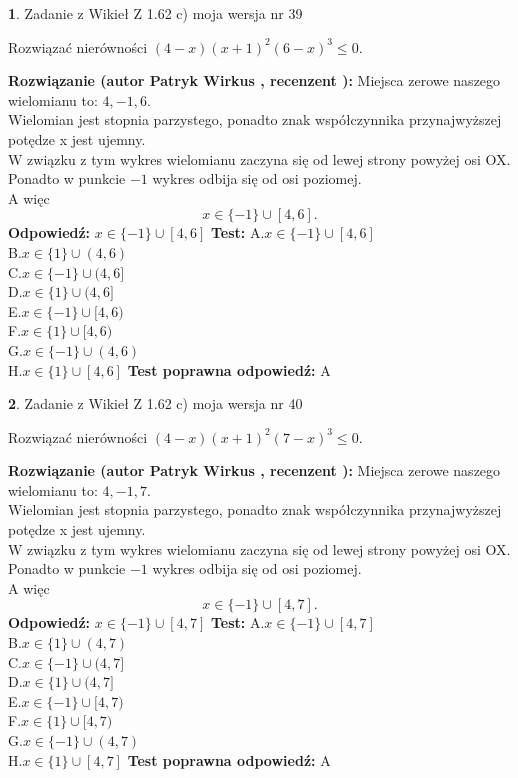 \documentclass[12pt, a4paper]{article}
\theoremstyle{definition} %
\newtheorem{zad}{}
\newcommand{\zadStart}[1]{\begin{zad}#1\newline}
\newcommand{\zadStop}{\end{zad}}
\newcommand{\rozwStart}[2]{\noindent \textbf{Rozwiązanie (autor #1 , recenzent #2): }\newline}
\newcommand{\rozwStop}{\newline}
\newcommand{\odpStart}{\noindent \textbf{Odpowiedź:}\newline}
\newcommand{\odpStop}{\newline}
\newcommand{\testStart}{\noindent \textbf{Test:}\newline}
\newcommand{\testStop}{\newline}
\newcommand{\kluczStart}{\noindent \textbf{Test poprawna odpowiedź:}\newline}
\newcommand{\kluczStop}{\newline}
\begin{document}
\zadStart{Zadanie z Wikieł Z 1.62 c) moja wersja nr 39}

Rozwiązać nierówności $(4-x)(x+1)^{2}(6-x)^{3}\le0$.
\zadStop
\rozwStart{Patryk Wirkus}{}
Miejsca zerowe naszego wielomianu to: $4, -1, 6$.\\
Wielomian jest stopnia parzystego, ponadto znak współczynnika przy\linebreak najwyższej potędze x jest ujemny.\\ W związku z tym wykres wielomianu zaczyna się od lewej strony powyżej osi OX.\\
Ponadto w punkcie $-1$ wykres odbija się od osi poziomej.\\
A więc $$x \in \{-1\} \cup [4,6].$$
\rozwStop
\odpStart
$x \in \{-1\} \cup [4,6]$
\odpStop
\testStart
A.$x \in \{-1\} \cup [4,6]$\\
B.$x \in \{1\} \cup (4,6)$\\
C.$x \in \{-1\} \cup (4,6]$\\
D.$x \in \{1\} \cup (4,6]$\\
E.$x \in \{-1\} \cup [4,6)$\\
F.$x \in \{1\} \cup [4,6)$\\
G.$x \in \{-1\} \cup (4,6)$\\
H.$x \in \{1\} \cup [4,6]$
\testStop
\kluczStart
A
\kluczStop



\zadStart{Zadanie z Wikieł Z 1.62 c) moja wersja nr 40}

Rozwiązać nierówności $(4-x)(x+1)^{2}(7-x)^{3}\le0$.
\zadStop
\rozwStart{Patryk Wirkus}{}
Miejsca zerowe naszego wielomianu to: $4, -1, 7$.\\
Wielomian jest stopnia parzystego, ponadto znak współczynnika przy\linebreak najwyższej potędze x jest ujemny.\\ W związku z tym wykres wielomianu zaczyna się od lewej strony powyżej osi OX.\\
Ponadto w punkcie $-1$ wykres odbija się od osi poziomej.\\
A więc $$x \in \{-1\} \cup [4,7].$$
\rozwStop
\odpStart
$x \in \{-1\} \cup [4,7]$
\odpStop
\testStart
A.$x \in \{-1\} \cup [4,7]$\\
B.$x \in \{1\} \cup (4,7)$\\
C.$x \in \{-1\} \cup (4,7]$\\
D.$x \in \{1\} \cup (4,7]$\\
E.$x \in \{-1\} \cup [4,7)$\\
F.$x \in \{1\} \cup [4,7)$\\
G.$x \in \{-1\} \cup (4,7)$\\
H.$x \in \{1\} \cup [4,7]$
\testStop
\kluczStart
A
\kluczStop
\end{document}
